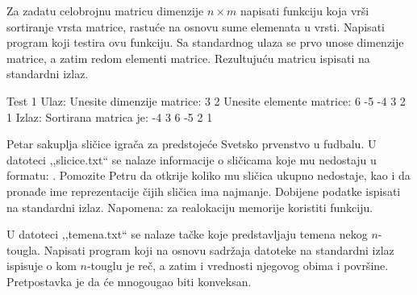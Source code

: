 \begin{Exercise}[label=339]
Za zadatu celobrojnu matricu dimenzije $n \times m$ napisati funkciju
koja vrši sortiranje vrsta matrice, rastuće na osnovu sume
elemenata u vrsti. Napisati program koji testira ovu funkciju. Sa
standardnog ulaza se prvo unose dimenzije matrice, a zatim redom
elementi matrice. Rezultujuću matricu ispisati na standardni
izlaz.

\begin{maxitest}
\begin{test}{Test 1}
Ulaz:  Unesite dimenzije matrice:
       3 2
       Unesite elemente matrice:
       6 -5
       -4 3
       2 1
Izlaz: Sortirana matrica je:
       -4 3 
       6 -5 
       2 1   
\end{test}
\end{maxitest}
\end{Exercise}
\begin{Answer}[ref=339]
\end{Answer}

\begin{Exercise}[label=340]
Petar sakuplja sličice igrača za predstojeće Svetsko
prvenstvo u fudbalu. U datoteci ,,slicice.txt`` se nalaze
informacije o sličicama koje mu nedostaju u formatu:
. Pomozite Petru
da otkrije koliko mu sličica ukupno nedostaje, kao i da
pronađe ime reprezentacije čijih sličica ima najmanje.
Dobijene podatke ispisati na standardni izlaz. Napomena: za
realokaciju memorije koristiti  funkciju.
\end{Exercise}
\begin{Answer}[ref=340]
\end{Answer}

\begin{Exercise}[label=341]
U datoteci ,,temena.txt`` se nalaze tačke koje predstavljaju
temena nekog $n$-tougla. Napisati program koji na osnovu
sadržaja datoteke na standardni izlaz ispisuje o kom
$n$-touglu je reč, a zatim i vrednosti njegovog obima i
površine. Pretpostavka je da će mnogougao biti konveksan.
\end{Exercise}
\begin{Answer}[ref=341]
\end{Answer}

